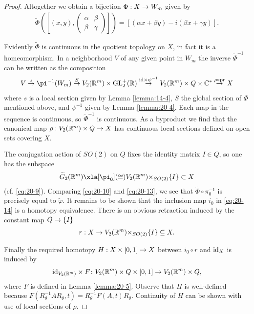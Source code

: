 \begin{proof}
  Altogether we obtain a bijection $\Phi  : X \rightarrow  {W}_{m}$ given by
  \begin{align}\label{eq:20-13}
    \widetilde{\Phi}\left(\left[(x, y), \begin{pmatrix}\alpha & \beta\\ \beta & \gamma\end{pmatrix}\right] \right)  
    = [ (\alpha x + \beta y) - i(\beta x + \gamma y)] .
  \end{align}
  
  Evidently $\widetilde{\Phi }$ is continuous in the quotient topology on $X$, in fact it is a homeomorphism. 
  In a neighborhood $V$ of any given point in ${W}_{m}$ the inverse ${\widetilde{\Phi }}^{-1}$ can be 
  written as the composition
  \[
    V\overset{s}
    { \ra  }{\pi }^{-1}( {W}_{m}) \overset{S}
    { \ra  }{V}_{2}( {\RR^m})  \times  {\R{GL}_2^+}( \B{R}) 
    \overset{\mathrm{{id}} \times  {\psi }^{-1}}
    { \ra  }{V}_{2}( {\RR^m})  \times  Q \times  {\B{C}}^*
    \overset{\rho\circ \text{pr}}
    { \ra  }X
  \]
  where $s$ is a local section given by Lemma \ref{lemma:14-4}, $S$ the global section of $\Phi$ mentioned above, 
  and ${\psi }^{-1}$ given by Lemma \ref{lemma:20-4}. Each map in the sequence is continuous, so ${\widetilde{\Phi }}^{-1}$ 
  is continuous. As a byproduct we find that the canonical map $\rho  : {V}_{2}( {{\mathbb{R}}^m})  \times  Q \rightarrow  X$ 
  has continuous local sections defined on open sets covering $X$.
  
  The conjugation action of ${SO}( 2)$ on $Q$ fixes the identity matrix $I \in  Q$, so one has the subspace
  \begin{align}\label{eq:20-14}
    \widetilde{G}_{2}( {\RR^m}) 
    \xla[\pi_0](\simee)
    {V}_{2}( {\RR^m}) { \times  }_{{SO}( 2) }\{ I\}  
    \subset  X
  \end{align}
  (cf. \eqref{eq:20-9}). Comparing \eqref{eq:20-10} and \eqref{eq:20-13}, we see that $\widetilde{\Phi } \circ  {\pi }_{0}^{-1}$ 
  is precisely equal to $\widetilde{\varphi }$. It remains to be shown that the inclusion map ${i}_{0}$ in \eqref{eq:20-14} is 
  a homotopy equivalence. There is an obvious retraction induced by the constant map $Q \rightarrow  \{ I\}$
  \[
    r: X \rightarrow  {V}_{2}( {{\mathbb{R}}^m}) { \times  }_{{SO}( 2) }\{ I\}  \subseteq  X.
  \]
  
  Finally the required homotopy $H : X \times  [  {0,1}]   \rightarrow  X$ between ${i}_{0} \circ  r$ and ${\mathrm{id}}_{X}$ is induced by
  \[
    {\mathrm{id}}_{{V}_{2}( {{\mathbb{R}}}^{m}) } \times  F\colon {V}_{2}( {{\mathbb{R}}}^{m})  \times  Q \times  [  {0,1}]   \rightarrow  {V}_{2}( {{\mathbb{R}}}^{m})  \times  Q,
  \]
  where $F$ is defined in Lemma \ref{lemma:20-5}. Observe that $H$ is well-defined 
  because $F( {{R}_{\theta }^{-1}A{R}_{\theta },t}) = {R}_{\theta }^{-1}F( {A,t}) {R}_{\theta }$. 
  Continuity of $H$ can be shown with use of local sections of $\rho$.
\end{proof}


